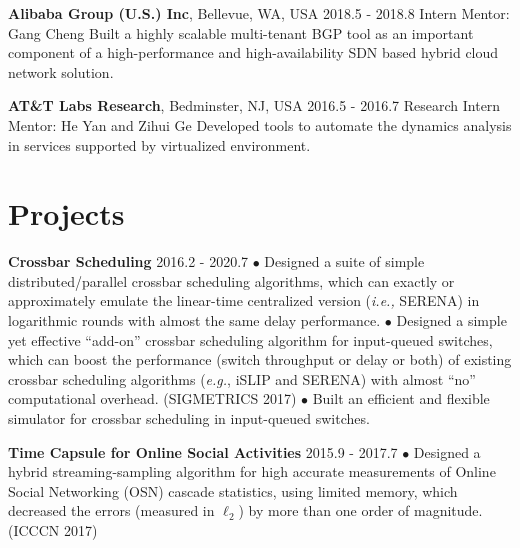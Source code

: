 \documentclass[line,11pt,letter]{F:/Dropbox (Personal)/personal-stuffs/CV/LaTeX/includes/cls/myRes}
\begin{document}
\begin{resume}
{\setlength{\parskip}{0pt}
{\bf Alibaba Group (U.S.) Inc}, Bellevue, WA, USA \hfill 2018.5 - 2018.8\break
{\hspace*{1em} Intern \hfill Mentor: Gang Cheng\break}
{\hspace*{1em} Built a highly scalable multi-tenant BGP tool as an important component of a high-performance and high-availability SDN based hybrid cloud network solution.  \break}
}\sspace

{\setlength{\parskip}{0pt}
{\bf AT\&T Labs Research}, Bedminster, NJ, USA \hfill 2016.5 - 2016.7\break
{\hspace*{1em} Research Intern \hfill Mentor: He Yan and Zihui Ge\break}
{\hspace*{1em} Developed tools to automate the dynamics analysis in services supported by virtualized environment.\break}
}\negspace
\section{Projects}
\vspace{-4pt}
{\setlength{\parskip}{0pt}
{\bf Crossbar Scheduling} \hfill 2016.2 - 2020.7\break
{\hspace*{1em} $\bullet$ Designed a suite of simple distributed/parallel crossbar scheduling algorithms, which can exactly or approximately emulate the linear-time centralized version ({\it i.e.,} SERENA) in logarithmic rounds with almost the same delay performance.\hfill\break}
{\hspace*{1em} $\bullet$ Designed a simple yet effective ``add-on'' crossbar scheduling algorithm for input-queued switches, which can boost the performance (switch throughput or delay or both) of existing crossbar scheduling algorithms ({\it e.g.}, iSLIP and SERENA) with almost ``no'' computational overhead. (SIGMETRICS 2017)\hfill\break}
{\hspace*{1em} $\bullet$ Built an efficient and flexible simulator for crossbar scheduling in input-queued switches.\hfill\break}
\sspace

}
{\setlength{\parskip}{0pt}
{\bf Time Capsule for Online Social Activities} \hfill 2015.9 - 2017.7 \break
{\hspace*{1em} $\bullet$ Designed a hybrid streaming-sampling algorithm for high accurate measurements of Online Social Networking (OSN) cascade statistics, using limited memory, which decreased the errors (measured in $\ell_2$) by more than one order of magnitude. (ICCCN 2017)\hfill\break}
\sspace

}
\end{resume}
\end{document}
